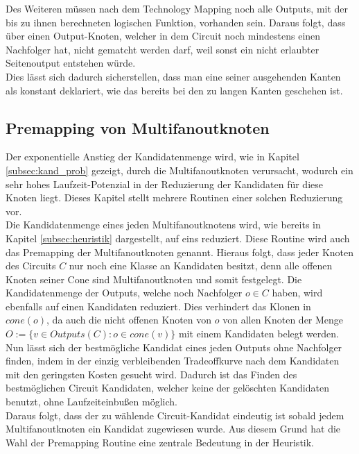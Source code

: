 \documentclass[11pt, a4paper, german]{article}
\newcommand{\TM}{Technology  Mapping }
\begin{document}
Des Weiteren müssen nach dem \TM noch alle Outputs, mit der bis zu ihnen berechneten logischen Funktion, vorhanden sein. Daraus folgt, dass über einen Output-Knoten, welcher in dem Circuit noch mindestens einen Nachfolger hat, nicht gematcht werden darf, weil sonst ein nicht erlaubter Seitenoutput entstehen würde.\\
 Dies lässt sich dadurch sicherstellen, dass man eine seiner ausgehenden Kanten als konstant deklariert, wie das bereits bei den zu langen Kanten geschehen ist. 

 \subsection{Premapping von Multifanoutknoten}
 \label{sec:premapping}
Der exponentielle Anstieg der Kandidatenmenge wird, wie in Kapitel \ref{subsec:kand_prob} gezeigt, durch die Multifanoutknoten verursacht, wodurch  ein sehr hohes Laufzeit-Potenzial in der Reduzierung der Kandidaten für diese Knoten liegt. Dieses Kapitel stellt mehrere Routinen einer solchen Reduzierung vor.\\

 Die Kandidatenmenge eines jeden Multifanoutknotens wird, wie bereits in Kapitel \ref{subsec:heuristik} dargestellt, auf eins reduziert. Diese Routine wird auch das Premapping der Multifanoutknoten genannt. Hieraus folgt, dass jeder Knoten des Circuits $C$ nur noch eine Klasse an Kandidaten besitzt, denn alle offenen Knoten seiner Cone sind Multifanoutknoten und somit festgelegt.  Die Kandidatenmenge der Outputs, welche noch Nachfolger $o \in C$ haben, wird ebenfalls auf einen Kandidaten reduziert. Dies verhindert das Klonen in $cone(o)$, da  auch die nicht offenen Knoten von $o$ von allen Knoten der Menge $O := \{ v \in Outputs(C): o \in cone(v) \}$ mit einem Kandidaten belegt werden.\\
Nun lässt sich der bestmögliche Kandidat eines jeden Outputs ohne Nachfolger finden, indem in der einzig verbleibenden Tradeoffkurve nach dem Kandidaten mit den geringsten Kosten gesucht wird. Dadurch ist das Finden des  bestmöglichen Circuit Kandidaten,  welcher keine der gelöschten Kandidaten benutzt, ohne Laufzeiteinbußen möglich. \\
Daraus folgt, dass der zu wählende Circuit-Kandidat eindeutig ist sobald jedem Multifanoutknoten ein Kandidat zugewiesen wurde. Aus diesem Grund hat die Wahl der Premapping Routine eine zentrale Bedeutung in der Heuristik.\\
\end{document}
